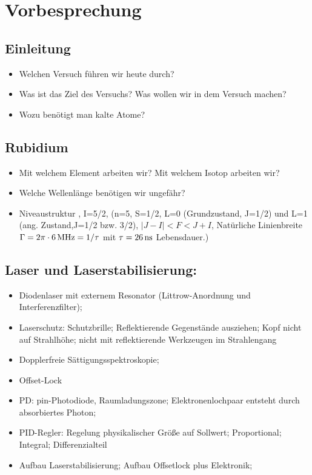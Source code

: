 \documentclass[10pt,a4paper]{extarticle}
\begin{document}
\section*{Vorbesprechung}

\subsection*{Einleitung}
\begin{itemize}
\item Welchen Versuch führen wir heute durch?
\item Was ist das Ziel des Versuchs? Was wollen wir in dem Versuch machen?
\item Wozu benötigt man kalte Atome?
\end{itemize}

\subsection*{Rubidium}
\begin{itemize}
\item Mit welchem Element arbeiten wir? Mit welchem Isotop arbeiten wir? 
\item Welche Wellenlänge benötigen wir ungefähr? 
\item Niveaustruktur , I=5/2, (n=5, S=1/2, L=0 (Grundzustand, J=1/2) und L=1 (ang. Zustand,J=1/2 bzw. 3/2), $|J-I|<F<J+I$, Natürliche Linienbreite  $\Gamma=2\pi\cdot\unit[6]{MHz} =1/\tau$ mit  $\tau=\unit[26]{ns}$ Lebensdauer.)
\end{itemize}

\subsection*{Laser und Laserstabilisierung:}
\begin{itemize}
\item Diodenlaser mit externem Resonator (Littrow-Anordnung und Interferenzfilter);
\item Laserschutz: Schutzbrille; Reflektierende Gegenstände ausziehen; Kopf nicht auf Strahlhöhe; nicht mit reflektierende Werkzeugen im Strahlengang
\item Dopplerfreie Sättigungsspektroskopie;
\item Offset-Lock
\item PD: pin-Photodiode, Raumladungszone; Elektronenlochpaar entsteht durch absorbiertes Photon;
\item PID-Regler: Regelung physikalischer Größe auf Sollwert; Proportional; Integral; Differenzialteil
\item Aufbau Laserstabilisierung; Aufbau Offsetlock plus Elektronik;
\end{itemize}
\end{document}
